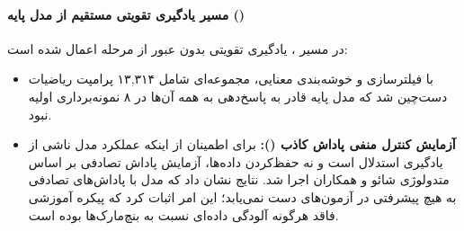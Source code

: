 \paragraph*{مسیر یادگیری تقویتی مستقیم از مدل پایه ()}
در مسیر ، یادگیری تقویتی بدون عبور از مرحله  اعمال شده است:
\begin{itemize}
    \item با فیلترسازی و خوشه‌بندی معنایی، مجموعه‌ای شامل ۱۳,۳۱۴ پرامپت ریاضیات دست‌چین شد که مدل پایه قادر به پاسخ‌دهی به همه آن‌ها در ۸ نمونه‌برداری اولیه نبود.
    \item \textbf{آزمایش کنترل منفی پاداش کاذب ():} برای اطمینان از اینکه عملکرد مدل ناشی از یادگیری استدلال است و نه حفظ‌کردن داده‌ها، آزمایش پاداش تصادفی بر اساس متدولوژی شائو و همکاران \cite{shao2025spurious} اجرا شد. نتایج نشان داد که مدل با پاداش‌های تصادفی به هیچ پیشرفتی در آزمون‌های  دست نمی‌یابد؛ این امر اثبات کرد که پیکره آموزشی فاقد هرگونه آلودگی داده‌ای نسبت به بنچ‌مارک‌ها بوده است.
\end{itemize}